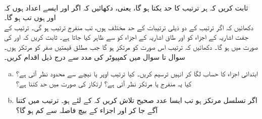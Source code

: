 \\
ثابت کریں کہ ہر ترتیب کا حد یکتا ہو گا، یعنی، دکھائیں کہ اگر  اور  ایسے اعداد ہوں کہ  اور  ہوں تب  ہو گا۔
\\
دکھائیں کہ اگر ترتیب  کے دو ذیلی ترتیبات کے حد مختلف ہوں،  تب  منفرج ترتیب ہو گی۔ 
ترتیب  کے جفت اشاریہ کے اجزاء کو  اور طاق اشاریہ کے اجزاء کو  سے ظاہر کیا جاتا ہے۔ ثابت کریں کہ  اور  کی صورت میں  ہو گا۔
دکھائیں کہ ترتیب  اس صورت  کو مرتکز ہو گا جب مطلق قیمتیں  صفر کو مرتکز ہوں۔
\\
سوال  تا سوال  میں کمپیوٹر کی مدد سے درج ذیل اقدام کریں۔
\begin{enumerate}[a.]
\item
ابتدائی  اجزاء کا حساب لگا کر انہیں ترسیم کریں۔ کیا ترتیب اوپر یا نیچے سے محدود نظر آتی ہے؟ کیا یہ منفرج یا مرتکز نظر آتی ہے؟ ارتکاز کی صورت میں حد  کتنا ہے؟
\item
اگر تسلسل مرتکز ہو تب ایسا عدد صحیح  تلاش کریں کہ  کے لئے  ہو۔ ترتیب میں کتنا آگے جا کر   اور اجزاء کے بیچ فاصلہ  سے کم ہو گا؟
\end{enumerate}

